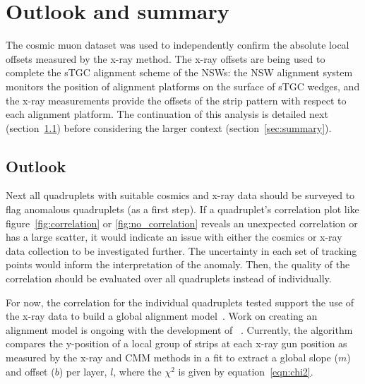 
\chapter{Outlook and summary}
\label{chap:outlook_and_summary}

The cosmic muon dataset was used to independently confirm the absolute local offsets measured by the x-ray method. The x-ray offsets are being used to complete the sTGC alignment scheme of the NSWs: the NSW alignment system monitors the position of alignment platforms on the surface of sTGC wedges, and the x-ray measurements provide the offsets of the strip pattern with respect to each alignment platform. The continuation of this analysis is detailed next (section~\ref{sec:outlook}) before considering the larger context (section~\ref{sec:summary}). 

\section{Outlook}
\label{sec:outlook}

Next all quadruplets with suitable cosmics and x-ray data should be surveyed to flag anomalous quadruplets (as a first step). If a quadruplet's correlation plot like figure~\ref{fig:correlation} or \ref{fig:no_correlation} reveals an unexpected correlation or has a large scatter, it would indicate an issue with either the cosmics or x-ray data collection to be investigated further. The uncertainty in each set of tracking points would inform the interpretation of the anomaly. Then, the quality of the correlation should be evaluated over all quadruplets instead of individually. 
 
For now, the correlation for the individual quadruplets tested support the use of the x-ray data to build a global alignment model~\cite{lefebvre_precision_2020}. Work on creating an alignment model is ongoing with the development of ~\cite{lefebvre_stgc_as_built_fit}. Currently, the algorithm compares the y-position of a local group of strips at each x-ray gun position as measured by the x-ray and CMM methods in a fit to extract a global slope ($m$) and offset ($b$) per layer, $l$, where the $\chi^2$ is given by equation~\ref{eqn:chi2}.

